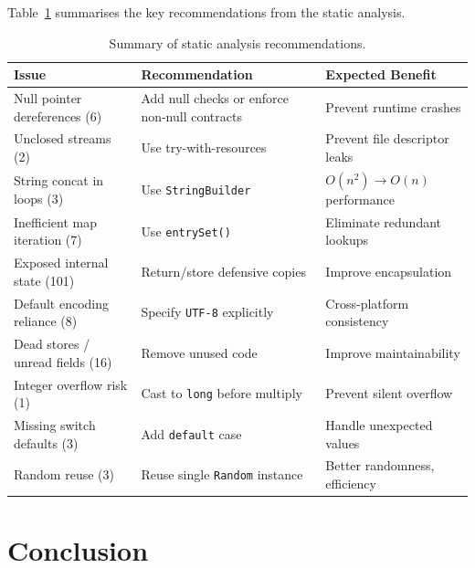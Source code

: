 \documentclass[11pt,a4paper]{article}
\begin{document}
Table~\ref{tab:recommendations} summarises the key recommendations from the static analysis.

\begin{table}[H]
    \centering
    \caption{Summary of static analysis recommendations.}
    \label{tab:recommendations}
    \small
    \begin{tabular}{p{4cm}p{5cm}p{4.5cm}}
        \toprule
        \textbf{Issue} & \textbf{Recommendation} & \textbf{Expected Benefit} \\
        \midrule
        Null pointer dereferences (6) & Add null checks or enforce non-null contracts & Prevent runtime crashes \\
        \addlinespace
        Unclosed streams (2) & Use try-with-resources & Prevent file descriptor leaks \\
        \addlinespace
        String concat in loops (3) & Use \texttt{StringBuilder} & $O(n^2) \to O(n)$ performance \\
        \addlinespace
        Inefficient map iteration (7) & Use \texttt{entrySet()} & Eliminate redundant lookups \\
        \addlinespace
        Exposed internal state (101) & Return/store defensive copies & Improve encapsulation \\
        \addlinespace
        Default encoding reliance (8) & Specify \texttt{UTF-8} explicitly & Cross-platform consistency \\
        \addlinespace
        Dead stores / unread fields (16) & Remove unused code & Improve maintainability \\
        \addlinespace
        Integer overflow risk (1) & Cast to \texttt{long} before multiply & Prevent silent overflow \\
        \addlinespace
        Missing switch defaults (3) & Add \texttt{default} case & Handle unexpected values \\
        \addlinespace
        Random reuse (3) & Reuse single \texttt{Random} instance & Better randomness, efficiency \\
        \bottomrule
    \end{tabular}
\end{table}

\section{Conclusion}
\end{document}
